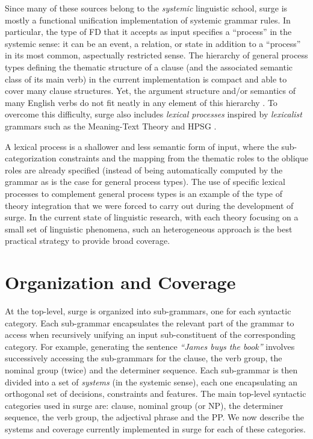 Since many of these sources belong to the {\em systemic} linguistic school,
{\sc surge} is mostly a functional unification implementation of systemic
grammar rules. In particular, the type of FD that it accepts as input specifies
a ``process'' in the systemic sense: it can be an event, a relation, or state
in addition to a ``process'' in its most common, aspectually restricted
sense. The hierarchy of general process types defining the thematic structure
of a clause (and the associated semantic class of its main verb) in the current
implementation is compact and able to cover many clause structures. Yet, the
argument structure and/or semantics of many English verbs do not fit neatly in
any element of this hierarchy \cite{levin}. To overcome this difficulty, {\sc
surge} also includes {\em lexical processes} inspired by {\em lexicalist}
grammars such as the Meaning-Text Theory \cite{melcuk-pertsov} and HPSG
\cite{pollard-sag94}.

A lexical process is a shallower and less semantic form of input, where the
sub-categorization constraints and the mapping from the thematic roles to
the oblique roles \cite{pollard-sag94} are already specified (instead of being
automatically computed by the grammar as is the case for general process
types). The use of specific lexical processes to complement general process
types is an example of the type of theory integration that we were forced
to carry out during the development of {\sc surge}. In the current state of
linguistic research, with each theory focusing on a small set of linguistic
phenomena, such an heterogeneous approach is the best practical strategy to
provide broad coverage.


\section{Organization and Coverage}

At the top-level, {\sc surge} is organized into sub-grammars, one for each
syntactic category. Each sub-grammar encapsulates the relevant part of the
grammar to access when recursively unifying an input sub-constituent of the
corresponding category. For example, generating the sentence {\em ``James buys
the book''} involves successively accessing the sub-grammars for the clause,
the verb group, the nominal group (twice) and the determiner sequence.  Each
sub-grammar is then divided into a set of {\em systems} (in the systemic
sense), each one encapsulating an orthogonal set of decisions, constraints and
features. The main top-level syntactic categories used in {\sc surge} are:
clause, nominal group (or NP), the determiner sequence, the verb group, the
adjectival phrase and the PP. We now describe the systems and coverage
currently implemented in {\sc surge} for each of these categories.

